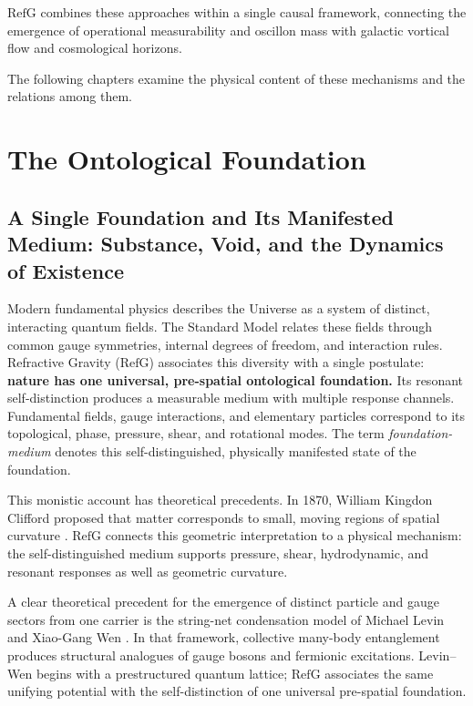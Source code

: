 \documentclass[11pt,a4paper]{article}
\newcommand{\RefG}{\mathrm{RefG}}
\begin{document}
$\RefG$ combines these approaches within a single causal framework, connecting the emergence of operational measurability and oscillon mass with galactic vortical flow and cosmological horizons.

The following chapters examine the physical content of these mechanisms and the relations among them.

\section{The Ontological Foundation}

\subsection{A Single Foundation and Its Manifested Medium: Substance, Void, and the Dynamics of Existence}

Modern fundamental physics describes the Universe as a system of distinct, interacting quantum fields. The Standard Model relates these fields through common gauge symmetries, internal degrees of freedom, and interaction rules. Refractive Gravity ($\RefG$) associates this diversity with a single postulate: \textbf{nature has one universal, pre-spatial ontological foundation.} Its resonant self-distinction produces a measurable medium with multiple response channels. Fundamental fields, gauge interactions, and elementary particles correspond to its topological, phase, pressure, shear, and rotational modes. The term \emph{foundation-medium} denotes this self-distinguished, physically manifested state of the foundation.

This monistic account has theoretical precedents. In 1870, William Kingdon Clifford proposed that matter corresponds to small, moving regions of spatial curvature \citep{clifford1876}. $\RefG$ connects this geometric interpretation to a physical mechanism: the self-distinguished medium supports pressure, shear, hydrodynamic, and resonant responses as well as geometric curvature.

A clear theoretical precedent for the emergence of distinct particle and gauge sectors from one carrier is the string-net condensation model of Michael Levin and Xiao-Gang Wen \citep{levin2005}. In that framework, collective many-body entanglement produces structural analogues of gauge bosons and fermionic excitations. Levin--Wen begins with a prestructured quantum lattice; $\RefG$ associates the same unifying potential with the self-distinction of one universal pre-spatial foundation.
\end{document}
